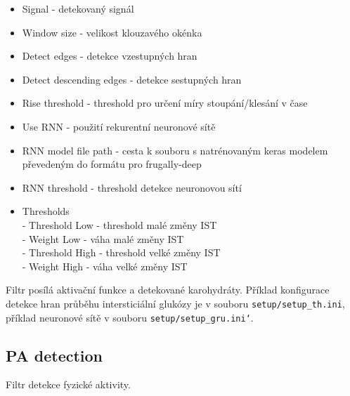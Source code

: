 \begin{itemize}
\setlength\itemsep{-1.5em}
\item Signal - detekovaný signál\\
\item Window size - velikost klouzavého okénka\\
\item Detect edges - detekce vzestupných hran\\
\item Detect descending edges - detekce sestupných hran\\
\item Rise threshold - threshold pro určení míry stoupání/klesání v čase\\
\item Use RNN - použití rekurentní neuronové sítě\\
\item RNN model file path - cesta k souboru s natrénovaným keras modelem převedeným do formátu pro frugally-deep\\
\item RNN threshold - threshold detekce neuronovou sítí\\
\item Thresholds\\
	\indent- Threshold Low - threshold malé změny IST\\
	\indent- Weight Low - váha malé změny IST\\
	\indent- Threshold High - threshold velké změny IST\\
	\indent- Weight High - váha velké změny IST
\end{itemize}

\noindent Filtr posílá aktivační funkce a detekované karohydráty.
Příklad konfigurace detekce hran průběhu intersticiální glukózy je v souboru \texttt{setup/setup\_th.ini}, příklad neuronové sítě v souboru \texttt{setup/setup\_gru.ini`}.

\subsection*{PA detection}

Filtr detekce fyzické aktivity.

